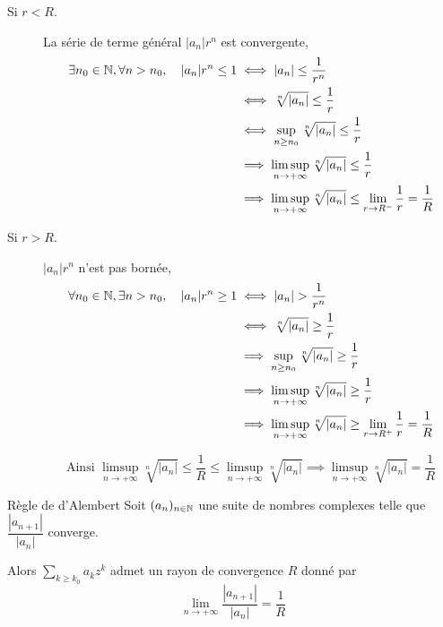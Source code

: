 \documentclass[a4paper, 12pt]{article}
\begin{document}
\begin{demonstration}
    \begin{description}
        \item[Si $r < R$.] 
        La série de terme général $|a_n|r^n$ est convergente,
        \begin{align*}
            \exists n_0 \in \mathbb{N}, \forall n > n_0, \quad |a_n| r^n \leq 1 &\iff |a_n| \leq \frac{1}{r^n} \\
            &\iff \sqrt[n]{|a_n|} \leq \frac{1}{r} \\
            &\iff \sup_{n \geq n_0} \sqrt[n]{|a_n|} \leq \frac{1}{r} \\
            &\implies \limsup_{n \to +\infty} \sqrt[n]{|a_n|} \leq \frac{1}{r} \\
            &\implies \limsup_{n \to +\infty} \sqrt[n]{|a_n|} \leq \lim_{r \to R^-} \frac{1}{r} = \frac{1}{R}
        \end{align*}
    
        \item[Si $r > R$.]
        $|a_n| r^n$ n'est pas bornée,
        \begin{align*}
            \forall n_0 \in \mathbb{N}, \exists n > n_0, \quad |a_n| r^n \geq 1 &\iff |a_n| > \frac{1}{r^n} \\
            &\iff \sqrt[n]{|a_n|} \geq \frac{1}{r} \\
            &\implies \sup_{n \geq n_0} \sqrt[n]{|a_n|} \geq \frac{1}{r} \\
            &\implies \limsup_{n \to +\infty} \sqrt[n]{|a_n|} \geq \frac{1}{r} \\
            &\implies \limsup_{n \to +\infty} \sqrt[n]{|a_n|} \geq \lim_{r \to R^+} \frac{1}{r} = \frac{1}{R}
        \end{align*}

        $$
        \text{Ainsi } \limsup_{n \to +\infty} \sqrt[n]{|a_n|} \leq \frac{1}{R} \leq \limsup_{n \to +\infty} \sqrt[n]{|a_n|} \implies \limsup\limits_{n \to +\infty} \sqrt[n]{|a_n|} = \dfrac{1}{R}
        $$
    \end{description}
\end{demonstration}

\begin{corollaire}{Règle de d'Alembert}{}
    Soit $(a_n)_{n \in \mathbb{N}}$ une suite de nombres complexes telle que $\dfrac{|a_{n+1}|}{|a_n|}$ converge.

    Alors $\sum\limits_{k \geq k_0} a_k z^k$ admet un rayon de convergence $R$ donné par
    $$
    \lim_{n \to +\infty} \frac{|a_{n+1}|}{|a_n|} = \frac{1}{R}
    $$
\end{corollaire}
\end{document}
